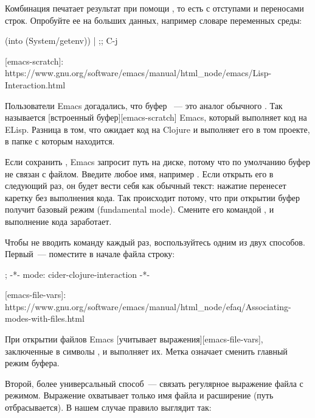 Комбинация  печатает результат при помощи , то есть с отступами и переносами строк. Опробуйте ее на больших данных, например словаре переменных среды:

\begin{english}
  \begin{clojure}
(into {} (System/getenv)) | ;; C-j
  \end{clojure}
\end{english}

[emacs-scratch]: https://www.gnu.org/software/emacs/manual/html\_node/emacs/Lisp-Interaction.html

Пользователи Emacs догадались, что буфер ~--- это аналог обычного . Так называется [встроенный буфер][emacs-scratch] Emacs, который выполняет код на ELisp. Разница в том, что  ожидает код на Clojure и выполняет его в том проекте, в папке с которым находится.

Если сохранить , Emacs запросит путь на диске, потому что по умолчанию буфер не связан с файлом. Введите любое имя, например . Если открыть его в следующий раз, он будет вести себя как обычный текст: нажатие  перенесет каретку без выполнения кода. Так происходит потому, что при открытии буфер получит базовый режим (fundamental mode). Смените его командой , и выполнение кода заработает.

Чтобы не вводить команду каждый раз, воспользуйтесь одним из двух способов. Первый~--- поместите в начале файла строку:

\begin{english}
  \begin{text}
; -*- mode: cider-clojure-interaction -*-
  \end{text}
\end{english}

[emacs-file-vars]: https://www.gnu.org/software/emacs/manual/html\_node/efaq/Associating-modes-with-files.html

При открытии файлов Emacs [учитывает выражения][emacs-file-vars], заключенные в символы \code{-*-}, и выполняет их. Метка  означает сменить главный режим буфера.

Второй, более универсальный способ~--- связать регулярное выражение файла с режимом. Выражение охватывает только имя файла и расширение (путь отбрасывается). В нашем случае правило выглядит так:

